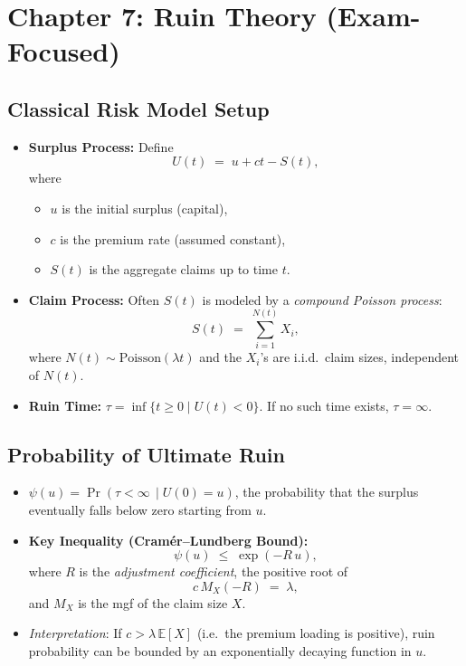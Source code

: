 \documentclass[13pt,a4paper]{article}
\begin{document}
\section{Chapter 7: Ruin Theory (Exam-Focused)}
\label{sec:chapter7}

\subsection{Classical Risk Model Setup}
\begin{itemize}
  \item \textbf{Surplus Process:} Define
  \[
    U(t) \;=\; u + ct - S(t),
  \]
  where
  \begin{itemize}
    \item \(u\) is the initial surplus (capital),
    \item \(c\) is the premium rate (assumed constant),
    \item \(S(t)\) is the aggregate claims up to time \(t\).
  \end{itemize}
  \item \textbf{Claim Process:} Often \(S(t)\) is modeled by a \emph{compound Poisson process}: 
  \[
    S(t) \;=\; \sum_{i=1}^{N(t)} X_i,
  \]
  where \(N(t)\sim \mathrm{Poisson}(\lambda t)\) and the \(X_i\)'s are i.i.d.\ claim sizes, independent of \(N(t)\).
  \item \textbf{Ruin Time:} \(\tau = \inf \{ t \ge 0 \mid U(t) < 0 \}\). If no such time exists, \(\tau = \infty\).
\end{itemize}

\subsection{Probability of Ultimate Ruin}
\begin{itemize}
  \item \(\psi(u) = \Pr(\tau < \infty \,\mid U(0)=u)\), the probability that the surplus eventually falls below zero starting from \(u\).
  \item \textbf{Key Inequality (Cram\'er--Lundberg Bound):} 
    \[
      \psi(u) \;\le\; \exp(-R\,u),
    \]
    where \(R\) is the \emph{adjustment coefficient}, the positive root of 
    \[
      c\, M_X(-R) \;=\; \lambda,
    \]
    and \(M_X\) is the mgf of the claim size \(X\). 
    \item \emph{Interpretation}: If \(c > \lambda \,\mathbb{E}[X]\) (i.e.\ the premium loading is positive), ruin probability can be bounded by an exponentially decaying function in \(u\).
\end{itemize}
\end{document}
